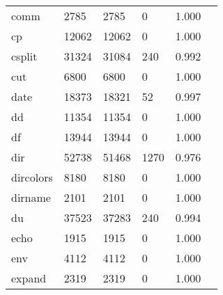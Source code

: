 \begin{longtable}{lp{2.4cm}p{2.4cm}p{2.4cm}p{2.4cm}p{2.4cm}}
comm      &                                    2785 &                        2785 &                            0 &                                   1.000 \\
cp        &                                   12062 &                       12062 &                            0 &                                   1.000 \\
csplit    &                                   31324 &                       31084 &                          240 &                                   0.992 \\
cut       &                                    6800 &                        6800 &                            0 &                                   1.000 \\
date      &                                   18373 &                       18321 &                           52 &                                   0.997 \\
dd        &                                   11354 &                       11354 &                            0 &                                   1.000 \\
df        &                                   13944 &                       13944 &                            0 &                                   1.000 \\
dir       &                                   52738 &                       51468 &                         1270 &                                   0.976 \\
dircolors &                                    8180 &                        8180 &                            0 &                                   1.000 \\
dirname   &                                    2101 &                        2101 &                            0 &                                   1.000 \\
du        &                                   37523 &                       37283 &                          240 &                                   0.994 \\
echo      &                                    1915 &                        1915 &                            0 &                                   1.000 \\
env       &                                    4112 &                        4112 &                            0 &                                   1.000 \\
expand    &                                    2319 &                        2319 &                            0 &                                   1.000 \\

\end{longtable}

